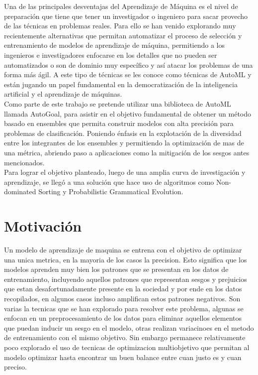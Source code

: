 \documentclass[runningheads,a4paper]{llncs}
\begin{document}
	Una de las principales desventajas del Aprendizaje de Máquina es el nivel de preparación que tiene que
	tener un investigador o ingeniero para sacar provecho de las técnicas en problemas reales.
	Para ello se han venido explorando muy recientemente alternativas que permitan
	automatizar el proceso de selección y entrenamiento de modelos de aprendizaje de máquina,
	permitiendo a los ingenieros e investigadores enfocarse en los detalles que no pueden ser
	automatizados o son de dominio muy específico y así atacar los problemas de una forma más
	ágil. A este tipo de técnicas se les conoce como técnicas de AutoML y están jugando un
	papel fundamental en la democratización de la inteligencia artificial y el aprendizaje de
	máquinas.\\
	Como parte de este trabajo se pretende utilizar una biblioteca de AutoML llamada AutoGoal, para asistir en el objetivo fundamental de
	obtener un método basado en ensembles que permita construir modelos con alta precisión
	para problemas de clasificación. Poniendo énfasis en la explotación de la diversidad entre los
	integrantes de los ensembles y permitiendo la optimización de mas de una métrica, abriendo
	paso a aplicaciones como la mitigación de los sesgos antes mencionados.\\
	Para lograr el objetivo planteado, luego de una amplia curva de investigación y aprendizaje, se llegó a una solución que hace uso de algoritmos como Non-dominated Sorting y Probabilistic Grammatical Evolution.
	
	\section*{Motivación}
	
	Un modelo de aprendizaje de maquina se entrena con el objetivo de optimizar una unica metrica, en la mayoria de los casos la precision. Esto significa que los modelos aprenden muy bien los patrones que se presentan en los datos de entrenamiento, incluyendo aquellos patrones que representan sesgos y prejuicios que estan desafortunadamente presente en la sociedad y por ende en los datos recopilados, en algunos casos incluso amplifican estos patrones negativos. Son varias la tecnicas que se han explorado para resolver este problema, algunas se enfocan en un preprocesamiento de los datos para eliminar aquellos elementos que puedan inducir un sesgo en el modelo, otras realizan variacinoes en el metodo de entrenamiento con el mismo objetivo. Sin embargo permanece relativamente poco explorado el uso de tecnicas de optimizacion multiobjetivo que permitan al modelo optimizar hasta encontrar un buen balance entre cuan justo es y cuan preciso.
	
\end{document}
